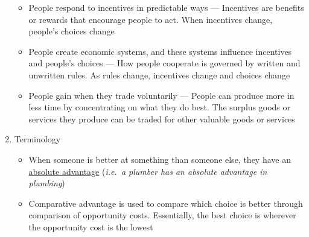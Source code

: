 \documentclass[12pt]{article}
\begin{document}
\begin{enumerate}
\begin{itemize}
      \item People respond to incentives in predictable ways — Incentives are benefits or rewards that encourage people to act. When incentives change, people's choices change

      \item People create economic systems, and these systems influence incentives and people's choices — How people cooperate is governed by written and unwritten rules. As rules change, incentives change and choices change

      \item People gain when they trade voluntarily — People can produce more in less time by concentrating on what they do best. The surplus goods or services they produce can be traded for other valuable goods or services

    \end{itemize}

  \item Terminology

    \begin{itemize}

      \item When someone is better at something than someone else, they have an \underline{absolute advantage} (\textit{i.e.\ a plumber has an absolute advantage in plumbing})

      \item Comparative advantage is used to compare which choice is better through comparison of opportunity costs. Essentially, the best choice is wherever the opportunity cost is the lowest

    \end{itemize}

\end{enumerate}
\end{document}
